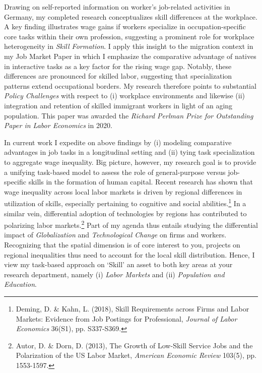 \documentclass[12pt]{letter} %
\begin{document}
\begin{letter}
Drawing on self-reported information on worker's job-related activities in Germany, my completed research conceptualizes skill differences at the workplace. A key finding illustrates wage gains if workers specialize in occupation-specific core tasks within their own profession, suggesting a prominent role for workplace heterogeneity in \textit{Skill Formation}. I apply this insight to the migration context in my Job Market Paper in which I emphasize the comparative advantage of natives in interactive tasks as a key factor for the rising wage gap. Notably, these differences are pronounced for skilled labor, suggesting that specialization patterns extend occupational borders. My research therefore points to substantial \textit{Policy Challenges} with respect to (i) workplace environments and likewise (ii) integration and retention of skilled immigrant workers in light of an aging population. This paper was awarded the \textit{Richard Perlman Prize for Outstanding Paper in Labor Economics} in 2020.



In current work I expedite on above findings by (i) modeling comparative advantages in job tasks in a longitudinal setting and (ii) tying task specialization to aggregate wage inequality. Big picture, however, my research goal is to provide a unifying task-based model to assess the role of general-purpose versus job-specific skills in the formation of human capital. Recent research has shown that wage inequality across local labor markets is driven by regional differences in utilization of skills, especially pertaining to cognitive and social abilities.\footnote{Deming, D. \& Kahn, L. (2018), Skill Requirements across Firms and Labor Markets: Evidence from Job Postings for Professional, \textit{Journal of Labor Economics} 36(S1), pp. S337-S369.} In a similar vein, differential adoption of technologies by regions has contributed to polarizing labor markets.\footnote{Autor, D. \& Dorn, D. (2013), The Growth of Low-Skill Service Jobs and the Polarization of the US Labor Market, \textit{American Economic Review} 103(5), pp. 1553-1597.} Part of my agenda thus entails studying the differential impact of \textit{Globalization} and \textit{Technological Change} on firms and workers. Recognizing that the spatial dimension is of core interest to you, projects on regional inequalities thus need to account for the local skill distribution. Hence, I view my task-based approach on `Skill' an asset to both key areas at your research department, namely (i) \textit{Labor Markets} and (ii) \textit{Population and Education}. 



\end{letter}
\end{document}
